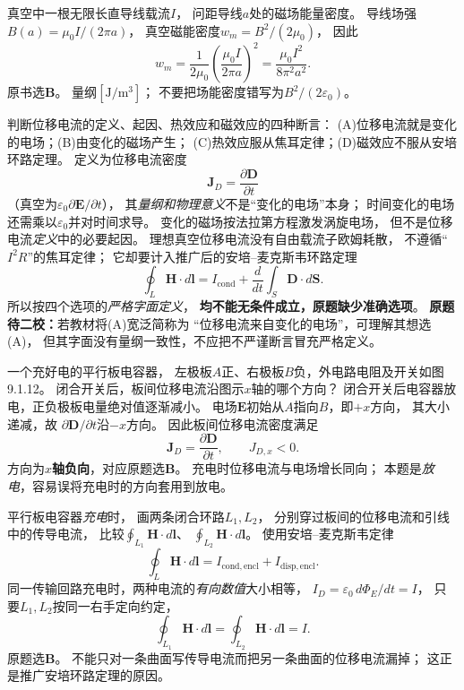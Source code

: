 \problemtext 真空中一根无限长直导线载流$I$，
问距导线$a$处的磁场能量密度。
\workings
导线场强
$B(a)=\mu_0I/(2\pi a)$，
真空磁能密度$w_m=B^2/(2\mu_0)$，
因此
\[
\boxed{w_m=\frac1{2\mu_0}
\left(\frac{\mu_0I}{2\pi a}\right)^2
=\frac{\mu_0I^2}{8\pi^2a^2}}.
\]
原书选\textbf{B}。
\crosscheck 量纲$[\mathrm{J/m^3}]$；
不要把场能密度错写为$B^2/(2\varepsilon_0)$。

\problemtext 判断位移电流的定义、起因、热效应和磁效应的四种断言：
(A)位移电流就是变化的电场；(B)由变化的磁场产生；
(C)热效应服从焦耳定律；(D)磁效应不服从安培环路定理。
\workings
定义为位移电流密度
\[
\boxed{\bm J_D=\frac{\partial\bm D}{\partial t}}
\]
（真空为$\varepsilon_0\partial\bm E/\partial t$），
其\emph{量纲和物理意义}不是“变化的电场”本身；
时间变化的电场还需乘以$\varepsilon_0$并对时间求导。
变化的磁场按法拉第方程激发涡旋电场，
但不是位移电流\emph{定义}中的必要起因。
理想真空位移电流没有自由载流子欧姆耗散，
不遵循“$I^2R$”的焦耳定律；
它却要计入推广后的安培--麦克斯韦环路定理
\[
\oint_L\bm H\cdot d\bm l
=I_{\mathrm{cond}}+\frac{d}{dt}\int_S\bm D\cdot d\bm S.
\]
所以按四个选项的\emph{严格字面定义}，
\textbf{均不能无条件成立，原题缺少准确选项}。
\crosscheck \textbf{原题待二校：}若教材将(A)宽泛简称为
“位移电流来自变化的电场”，可理解其想选(A)，
但其字面没有量纲一致性，不应把不严谨断言冒充严格定义。

\problemtext 一个充好电的平行板电容器，
左极板$A$正、右极板$B$负，外电路电阻及开关如图9.1.12。
闭合开关后，板间位移电流沿图示$x$轴的哪个方向？
\workings
闭合开关后电容器放电，正负极板电量绝对值逐渐减小。
电场$\bm E$初始从$A$指向$B$，即$+x$方向，
其大小递减，故
$\partial\bm D/\partial t$沿$-x$方向。
因此板间位移电流密度满足
\[
\boxed{\bm J_D=\frac{\partial\bm D}{\partial t},\qquad J_{D,x}<0}.
\]
方向为\textbf{$x$轴负向}，对应原题选\textbf{B}。
\crosscheck 充电时位移电流与电场增长同向；
本题是\emph{放电}，容易误将充电时的方向套用到放电。

\problemtext 平行板电容器\emph{充电}时，
画两条闭合环路$L_1,L_2$，
分别穿过板间的位移电流和引线中的传导电流，
比较$\oint_{L_1}\bm H\cdot d\bm l$、
$\oint_{L_2}\bm H\cdot d\bm l$。
\workings
使用安培--麦克斯韦定律
\[
\oint_L\bm H\cdot d\bm l
=I_{\mathrm{cond,encl}}+I_{\mathrm{disp,encl}}.
\]
同一传输回路充电时，两种电流的\emph{有向数值}大小相等，
$I_D=\varepsilon_0\,d\Phi_E/dt=I$，
只要$L_1,L_2$按同一右手定向约定，
\[
\boxed{\oint_{L_1}\bm H\cdot d\bm l
=\oint_{L_2}\bm H\cdot d\bm l=I}.
\]
原题选\textbf{B}。
\crosscheck 不能只对一条曲面写传导电流而把另一条曲面的位移电流漏掉；
这正是推广安培环路定理的原因。

